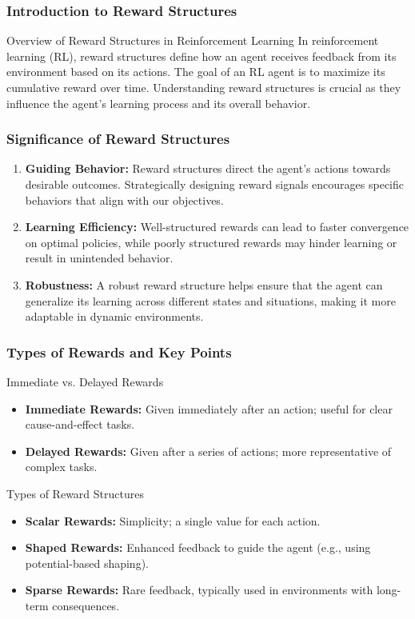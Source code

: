 \documentclass[aspectratio=169]{beamer}
\begin{document}
\frame{\titlepage}

\begin{frame}[fragile]
    \frametitle{Introduction to Reward Structures}
    \begin{block}{Overview of Reward Structures in Reinforcement Learning}
        In reinforcement learning (RL), reward structures define how an agent receives feedback from its environment based on its actions. The goal of an RL agent is to maximize its cumulative reward over time. Understanding reward structures is crucial as they influence the agent's learning process and its overall behavior.
    \end{block}
\end{frame}

\begin{frame}[fragile]
    \frametitle{Significance of Reward Structures}
    \begin{enumerate}
        \item \textbf{Guiding Behavior:} Reward structures direct the agent’s actions towards desirable outcomes. Strategically designing reward signals encourages specific behaviors that align with our objectives.
        \item \textbf{Learning Efficiency:} Well-structured rewards can lead to faster convergence on optimal policies, while poorly structured rewards may hinder learning or result in unintended behavior.
        \item \textbf{Robustness:} A robust reward structure helps ensure that the agent can generalize its learning across different states and situations, making it more adaptable in dynamic environments.
    \end{enumerate}
\end{frame}

\begin{frame}[fragile]
    \frametitle{Types of Rewards and Key Points}
    \begin{block}{Immediate vs. Delayed Rewards}
        \begin{itemize}
            \item \textbf{Immediate Rewards:} Given immediately after an action; useful for clear cause-and-effect tasks.
            \item \textbf{Delayed Rewards:} Given after a series of actions; more representative of complex tasks.
        \end{itemize}
    \end{block}
    
    \begin{block}{Types of Reward Structures}
        \begin{itemize}
            \item \textbf{Scalar Rewards:} Simplicity; a single value for each action.
            \item \textbf{Shaped Rewards:} Enhanced feedback to guide the agent (e.g., using potential-based shaping).
            \item \textbf{Sparse Rewards:} Rare feedback, typically used in environments with long-term consequences.
        \end{itemize}
    \end{block}
\end{frame}
\end{document}

